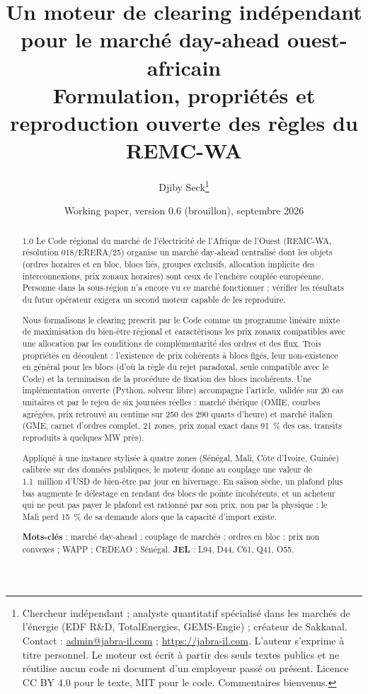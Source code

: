 \documentclass[a4paper,12pt]{article}
\title{\textbf{Un moteur de clearing indépendant pour le marché day-ahead ouest-africain}\\[4pt]
\large Formulation, propriétés et reproduction ouverte des règles du REMC-WA}
\author{Djiby Seck\thanks{Chercheur indépendant ; analyste quantitatif spécialisé dans les marchés de l'énergie (EDF R\&D, TotalEnergies, GEMS-Engie) ; créateur de Sakkanal. Contact : \href{mailto:admin@jabra-il.com}{admin@jabra-il.com} ; \url{https://jabra-il.com}. L'auteur s'exprime à titre personnel. Le moteur est écrit à partir des seuls textes publics et ne réutilise aucun code ni document d'un employeur passé ou présent. Licence CC BY 4.0 pour le texte, MIT pour le code. Commentaires bienvenus.}}
\date{Working paper, version 0.6 (brouillon), septembre 2026}
\theoremstyle{definition}
\begin{document}
\maketitle

\begin{abstract}
\small\setlength{\parskip}{0.2em}
\begin{spacing}{1.0}
\noindent Le Code régional du marché de l'électricité de l'Afrique de l'Ouest (REMC-WA, résolution 018/ERERA/25) organise un marché day-ahead centralisé dont les objets (ordres horaires et en bloc, blocs liés, groupes exclusifs, allocation implicite des interconnexions, prix zonaux horaires) sont ceux de l'enchère couplée européenne. Personne dans la sous-région n'a encore vu ce marché fonctionner ; vérifier les résultats du futur opérateur exigera un second moteur capable de les reproduire.

\smallskip
\noindent Nous formalisons le clearing prescrit par le Code comme un programme linéaire mixte de maximisation du bien-être régional et caractérisons les prix zonaux compatibles avec une allocation par les conditions de complémentarité des ordres et des flux. Trois propriétés en découlent : l'existence de prix cohérents à blocs figés, leur non-existence en général pour les blocs (d'où la règle du rejet paradoxal, seule compatible avec le Code) et la terminaison de la procédure de fixation des blocs incohérents. Une implémentation ouverte (Python, solveur libre) accompagne l'article, validée sur 20 cas unitaires et par le rejeu de six journées réelles : marché ibérique (OMIE, courbes agrégées, prix retrouvé au centime sur 250 des 290 quarts d'heure) et marché italien (GME, carnet d'ordres complet, 21 zones, prix zonal exact dans 91~\% des cas, transits reproduits à quelques MW près).

\smallskip
\noindent Appliqué à une instance stylisée à quatre zones (Sénégal, Mali, Côte d'Ivoire, Guinée) calibrée sur des données publiques, le moteur donne au couplage une valeur de 1.1~million d'USD de bien-être par jour en hivernage. En saison sèche, un plafond plus bas augmente le délestage en rendant des blocs de pointe incohérents, et un acheteur qui ne peut pas payer le plafond est rationné par son prix, non par la physique : le Mali perd 15~\% de sa demande alors que la capacité d'import existe.\par\vspace{0.15em}
\textbf{Mots-clés} : marché day-ahead ; couplage de marchés ; ordres en bloc ; prix non convexes ; WAPP ; CEDEAO ; Sénégal. \textbf{JEL} : L94, D44, C61, Q41, O55.
\end{spacing}
\end{abstract}
\end{document}
